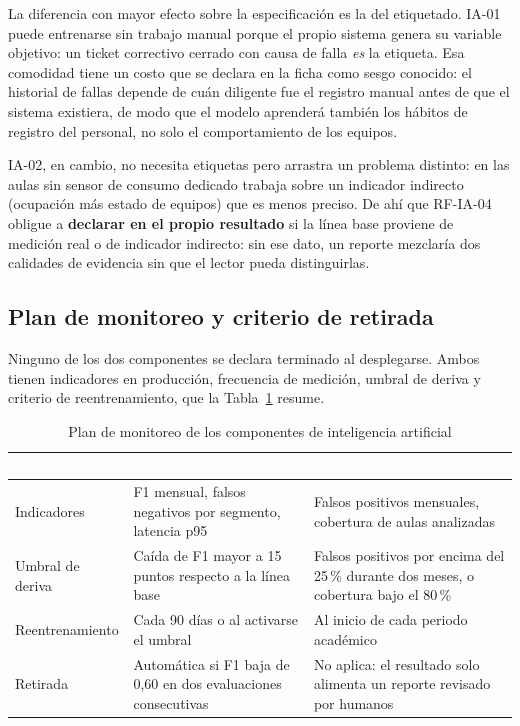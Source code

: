 La diferencia con mayor efecto sobre la especificaci\'on es la del etiquetado. IA-01 puede entrenarse sin trabajo manual porque el propio sistema genera su variable objetivo: un ticket correctivo cerrado con causa de falla \emph{es} la etiqueta. Esa comodidad tiene un costo que se declara en la ficha como sesgo conocido: el historial de fallas depende de cu\'an diligente fue el registro manual antes de que el sistema existiera, de modo que el modelo aprender\'a tambi\'en los h\'abitos de registro del personal, no solo el comportamiento de los equipos.

IA-02, en cambio, no necesita etiquetas pero arrastra un problema distinto: en las aulas sin sensor de consumo dedicado trabaja sobre un indicador indirecto (ocupaci\'on m\'as estado de equipos) que es menos preciso. De ah\'i que RF-IA-04 obligue a \textbf{declarar en el propio resultado} si la l\'inea base proviene de medici\'on real o de indicador indirecto: sin ese dato, un reporte mezclar\'ia dos calidades de evidencia sin que el lector pueda distinguirlas.

\subsection{Plan de monitoreo y criterio de retirada}

Ninguno de los dos componentes se declara terminado al desplegarse. Ambos tienen indicadores en producci\'on, frecuencia de medici\'on, umbral de deriva y criterio de reentrenamiento, que la Tabla~\ref{tab:monitoreo-ia} resume.

\begin{table}[H]
\centering
\small
\begin{tabular}{|p{2.9cm}|p{5.2cm}|p{5.2cm}|}
\hline
\cellcolor{sigagreen}\textcolor{white}{\textbf{Elemento}} & \cellcolor{sigagreen}\textcolor{white}{\textbf{IA-01}} & \cellcolor{sigagreen}\textcolor{white}{\textbf{IA-02}} \\ \hline
Indicadores & F1 mensual, falsos negativos por segmento, latencia p95 & Falsos positivos mensuales, cobertura de aulas analizadas \\ \hline
Umbral de deriva & Ca\'ida de F1 mayor a 15 puntos respecto a la l\'inea base & Falsos positivos por encima del 25\,\% durante dos meses, o cobertura bajo el 80\,\% \\ \hline
Reentrenamiento & Cada 90 d\'ias o al activarse el umbral & Al inicio de cada periodo acad\'emico \\ \hline
Retirada & Autom\'atica si F1 baja de 0,60 en dos evaluaciones consecutivas & No aplica: el resultado solo alimenta un reporte revisado por humanos \\ \hline
\end{tabular}
\caption{Plan de monitoreo de los componentes de inteligencia artificial}
\label{tab:monitoreo-ia}
\end{table}

